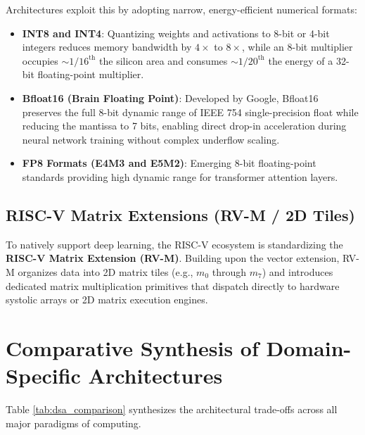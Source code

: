 Architectures exploit this by adopting narrow, energy-efficient numerical formats:
\begin{itemize}
    \item \textbf{INT8 and INT4}: Quantizing weights and activations to 8-bit or 4-bit integers reduces memory bandwidth by $4\times$ to $8\times$, while an 8-bit multiplier occupies $\sim 1/16^{\text{th}}$ the silicon area and consumes $\sim 1/20^{\text{th}}$ the energy of a 32-bit floating-point multiplier.
    \item \textbf{Bfloat16 (Brain Floating Point)}: Developed by Google, Bfloat16 preserves the full 8-bit dynamic range of IEEE 754 single-precision float while reducing the mantissa to 7 bits, enabling direct drop-in acceleration during neural network training without complex underflow scaling.
    \item \textbf{FP8 Formats (E4M3 and E5M2)}: Emerging 8-bit floating-point standards providing high dynamic range for transformer attention layers.
\end{itemize}

\subsection{RISC-V Matrix Extensions (RV-M / 2D Tiles)}
To natively support deep learning, the RISC-V ecosystem is standardizing the \textbf{RISC-V Matrix Extension (RV-M)}. Building upon the vector extension, RV-M organizes data into 2D matrix tiles (e.g., $m_0$ through $m_7$) and introduces dedicated matrix multiplication primitives that dispatch directly to hardware systolic arrays or 2D matrix execution engines.


\section{Comparative Synthesis of Domain-Specific Architectures}\label{sec:dsa_comparison}

Table \ref{tab:dsa_comparison} synthesizes the architectural trade-offs across all major paradigms of computing.

